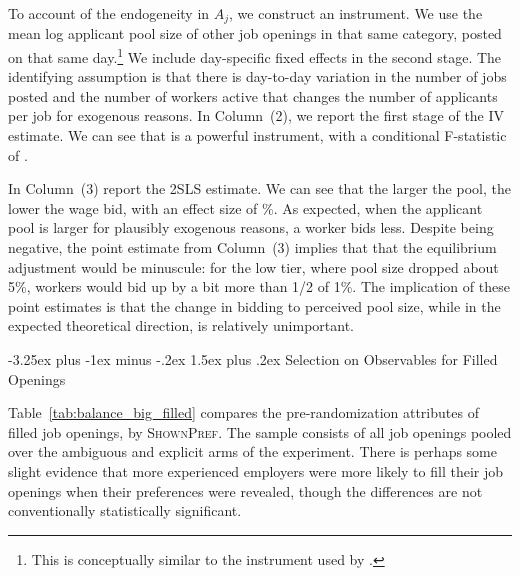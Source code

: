 \documentclass[12pt]{article}
\makeatletter
\renewcommand{\subsection}{%
  \@startsection{subsection}{2}{\z@}%
  {-3.25ex plus -1ex minus -.2ex}%
  {1.5ex plus .2ex}%
  {\normalfont\large\bfseries}%
}
\makeatother
\begin{document}


To account of the endogeneity in $A_j$, we construct an instrument. 
We use the mean log applicant pool size of other job openings in that same category, posted on that same day.\footnote{
  This is conceptually similar to the instrument used by \cite{camerer1997labor}. 
}
We include day-specific fixed effects in the second stage.
The identifying assumption is that there is day-to-day variation in the number of jobs posted and the number of workers active that changes the number of applicants per job for exogenous reasons.
In Column~(2), we report the first stage of the IV estimate.
We can see that is a powerful instrument, with a conditional F-statistic of \IVcondFstat{}. 

In Column~(3) report the 2SLS estimate.
We can see that the larger the pool, the lower the wage bid, with an effect size of \PoolSizeIV{}\%. 
As expected, when the applicant pool is larger for plausibly exogenous reasons, a worker bids less.
Despite being negative, the point estimate from Column~(3) implies that that the equilibrium adjustment would be minuscule: 
 for the low tier, where pool size dropped about 5\%, workers would bid up by a bit more than 1/2 of 1\%. 
The implication of these point estimates is that the change in bidding to perceived pool size, while in the expected theoretical direction, is relatively unimportant.




\subsection{Selection on Observables for Filled Openings} 
\label{supp_app:soo}

Table~\ref{tab:balance_big_filled} compares the pre-randomization attributes of filled job openings, by \textsc{ShownPref}.
The sample consists of all job openings pooled over the ambiguous and explicit arms of the experiment.
There is perhaps some slight evidence that more experienced employers were more likely to fill their job openings when their preferences were revealed, though the differences are not conventionally statistically significant.
\end{document}
